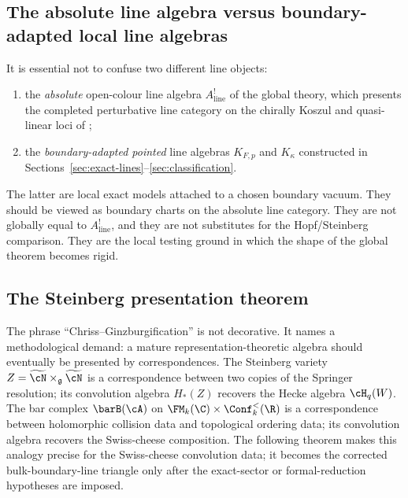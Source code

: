 \subsection{The absolute line algebra versus boundary-adapted local line algebras}

It is essential not to confuse two different line objects:
\begin{enumerate}[label=(\roman*),leftmargin=1.8em]
\item the \emph{absolute} open-colour line algebra
$A^!_{\mathrm{line}}$ of the global theory, which presents the
completed perturbative line category on the chirally Koszul and
quasi-linear loci of \cite{DNP25};
\item the \emph{boundary-adapted pointed} line algebras $K_{F,p}$ and $K_\kappa$ constructed in Sections~\ref{sec:exact-lines}--\ref{sec:classification}.
\end{enumerate}
The latter are local exact models attached to a chosen boundary
vacuum. They should be viewed as boundary charts on the absolute line
category. They are not globally equal to $A^!_{\mathrm{line}}$, and
they are not substitutes for the Hopf/Steinberg comparison. They are
the local testing ground in which the shape of the global theorem
becomes rigid.

\subsection{The Steinberg presentation theorem}

The phrase ``Chriss--Ginzburgification'' is not decorative.
It names a methodological demand: a mature representation-theoretic
algebra should eventually be presented by correspondences.
The Steinberg variety $Z = \widetilde{\cN} \times_{\mathfrak g}
\widetilde{\cN}$ is a correspondence between two copies of the
Springer resolution; its convolution algebra $H_*(Z)$ recovers the
Hecke algebra $\cH_q(W)$. The bar complex $\barB(\cA)$ on
$\FM_k(\C) \times \Conf_k^{<}(\R)$ is a correspondence between
holomorphic collision data and topological ordering data; its
convolution algebra recovers the Swiss-cheese composition.
The following theorem makes this analogy precise for the Swiss-cheese
convolution data; it becomes the corrected bulk-boundary-line triangle
only after the exact-sector or formal-reduction hypotheses are imposed.

